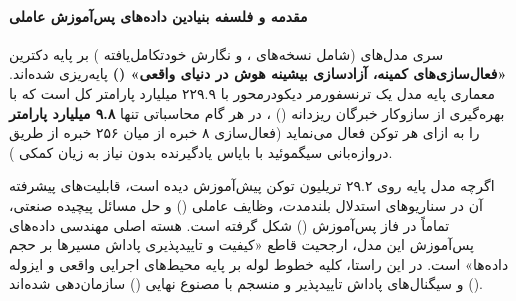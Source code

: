 \item {}

\paragraph*{مقدمه و فلسفه بنیادین داده‌های پس‌آموزش عاملی}
سری مدل‌های  (شامل نسخه‌های ،  و نگارش خودتکامل‌یافته ) بر پایه دکترین \textbf{«فعال‌سازی‌های کمینه، آزادسازی بیشینه هوش در دنیای واقعی» ()} پایه‌ریزی شده‌اند. معماری پایه مدل یک ترنسفورمر دیکودرمحور با ۲۲۹.۹ میلیارد پارامتر کل است که با بهره‌گیری از سازوکار خبرگان ریزدانه () \cite{dai2024deepseekmoe}، در هر گام محاسباتی تنها \textbf{۹.۸ میلیارد پارامتر} را به ازای هر توکن فعال می‌نماید (فعال‌سازی ۸ خبره از میان ۲۵۶ خبره از طریق دروازه‌بانی سیگموئید با بایاس یادگیرنده بدون نیاز به زیان کمکی \cite{wang2024auxiliary}).

اگرچه مدل پایه روی ۲۹.۲ تریلیون توکن پیش‌آموزش دیده است، قابلیت‌های پیشرفته آن در سناریوهای استدلال بلندمدت، وظایف عاملی () و حل مسائل پیچیده صنعتی، تماماً در فاز پس‌آموزش () شکل گرفته است. هسته اصلی مهندسی داده‌های پس‌آموزش این مدل، ارجحیت قاطع «کیفیت و تاییدپذیری پاداش مسیرها بر حجم داده‌ها» است. در این راستا، کلیه خطوط لوله بر پایه محیط‌های اجرایی واقعی و ایزوله () و سیگنال‌های پاداش تاییدپذیر و منسجم با مصنوع نهایی () سازمان‌دهی شده‌اند.

